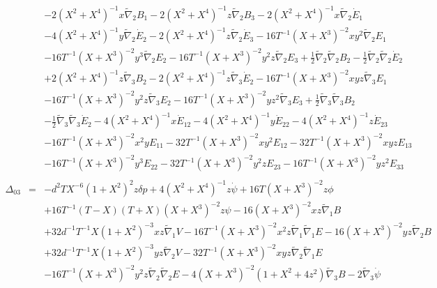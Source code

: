 \documentclass[10pt,letterpaper]{article}
\numberwithin{equation}{section}
\begin{document}
\begin{appendices}
\begin{eqnarray}
&& - 2 (X^2 + X^4)^{-1} x \tilde{\nabla}_{2}B_{1} - 2 (X^2 + X^4)^{-1} z \tilde{\nabla}_{2}B_{3} - 2 (X^2 + X^4)^{-1} x \tilde{\nabla}_{2}\dot{E}_{1} \nonumber \\ 
&& - 4 (X^2 + X^4)^{-1} y \tilde{\nabla}_{2}\dot{E}_{2} - 2 (X^2 + X^4)^{-1} z \tilde{\nabla}_{2}\dot{E}_{3} - 16 T^{-1} (X + X^3)^{-2} x y^2 \tilde{\nabla}_{2}E_{1} \nonumber \\ 
&& - 16 T^{-1} (X + X^3)^{-2} y^3 \tilde{\nabla}_{2}E_{2} - 16 T^{-1} (X + X^3)^{-2} y^2 z \tilde{\nabla}_{2}E_{3} + \tfrac{1}{2} \tilde{\nabla}_{2}\tilde{\nabla}_{2}B_{2} -  \tfrac{1}{2} \tilde{\nabla}_{2}\tilde{\nabla}_{2}\dot{E}_{2} \nonumber \\ 
&& + 2 (X^2 + X^4)^{-1} z \tilde{\nabla}_{3}B_{2} - 2 (X^2 + X^4)^{-1} z \tilde{\nabla}_{3}\dot{E}_{2} - 16 T^{-1} (X + X^3)^{-2} x y z \tilde{\nabla}_{3}E_{1} \nonumber \\ 
&& - 16 T^{-1} (X + X^3)^{-2} y^2 z \tilde{\nabla}_{3}E_{2} - 16 T^{-1} (X + X^3)^{-2} y z^2 \tilde{\nabla}_{3}E_{3} + \tfrac{1}{2} \tilde{\nabla}_{3}\tilde{\nabla}_{3}B_{2} \nonumber \\ 
&& -  \tfrac{1}{2} \tilde{\nabla}_{3}\tilde{\nabla}_{3}\dot{E}_{2}-4 (X^2 + X^4)^{-1} x \dot{E}_{12} - 4 (X^2 + X^4)^{-1} y \dot{E}_{22} - 4 (X^2 + X^4)^{-1} z \dot{E}_{23} \nonumber \\ 
&& - 16 T^{-1} (X + X^3)^{-2} x^2 y E_{11} - 32 T^{-1} (X + X^3)^{-2} x y^2 E_{12} - 32 T^{-1} (X + X^3)^{-2} x y z E_{13} \nonumber \\ 
&& - 16 T^{-1} (X + X^3)^{-2} y^3 E_{22} - 32 T^{-1} (X + X^3)^{-2} y^2 z E_{23} - 16 T^{-1} (X + X^3)^{-2} y z^2 E_{33}
\\  \nonumber\\ 
\Delta_{03}&=& - d^2 T X^{-6} (1 + X^2)^2 z \delta p + 4 (X^2 + X^4)^{-1} z \dot{\psi} + 16 T (X + X^3)^{-2} z \phi \nonumber \\ 
&& + 16 T^{-1} (T -  X) (T + X) (X + X^3)^{-2} z \psi - 16 (X + X^3)^{-2} x z \tilde{\nabla}_{1}B \nonumber \\ 
&& + 32 d^{-1} T^{-1} X (1 + X^2)^{-3} x z \tilde{\nabla}_{1}V - 16 T^{-1} (X + X^3)^{-2} x^2 z \tilde{\nabla}_{1}\tilde{\nabla}_{1}E - 16 (X + X^3)^{-2} y z \tilde{\nabla}_{2}B \nonumber \\ 
&& + 32 d^{-1} T^{-1} X (1 + X^2)^{-3} y z \tilde{\nabla}_{2}V - 32 T^{-1} (X + X^3)^{-2} x y z \tilde{\nabla}_{2}\tilde{\nabla}_{1}E \nonumber \\ 
&& - 16 T^{-1} (X + X^3)^{-2} y^2 z \tilde{\nabla}_{2}\tilde{\nabla}_{2}E - 4 (X + X^3)^{-2} (1 + X^2 + 4 z^2) \tilde{\nabla}_{3}B - 2 \tilde{\nabla}_{3}\dot{\psi} \nonumber \\ 

\end{eqnarray}
\end{appendices}
\end{document}
